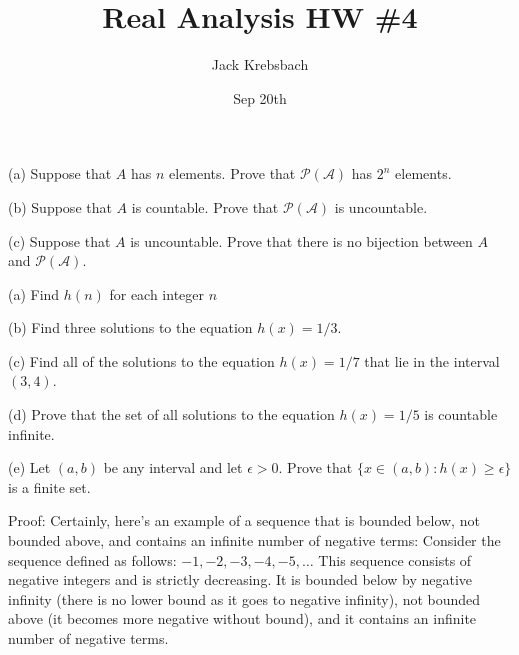 \documentclass{report}
\title{Real Analysis HW \#4}
\author{Jack Krebsbach }
\date{Sep 20th}
\begin{document}
\maketitle
{}


(a) Suppose that $A$ has $n$ elements. Prove that $\mathcal{P}(\mathcal{A})$ has $2^n$ elements.
\bigskip
\par
(b) Suppose that $A$ is countable. Prove that $\mathcal{P}(\mathcal{A})$ is uncountable.
\bigskip
\par
(c) Suppose that $A$ is uncountable. Prove that there is no bijection between $A$ and $\mathcal{P}(\mathcal{A})$.
\bigskip
\par


\sol 
(a) Find $h(n)$ for each integer $n$
\par
\bigskip

(b) Find three solutions to the equation $h(x)=1 / 3$.
\par
\bigskip
(c) Find all of the solutions to the equation $h(x)=1 / 7$ that lie in the interval $(3,4)$.
\par
\bigskip
(d) Prove that the set of all solutions to the equation $h(x)=1 / 5$ is countable infinite.
\par
\bigskip
(e) Let $(a, b)$ be any interval and let $\epsilon>0$. Prove that $\{x \in(a, b): h(x) \geq \epsilon\}$ is a finite set.
\par
\bigskip



Proof: Certainly, here's an example of a sequence that is bounded below, not bounded above, and contains an infinite number of negative terms:
Consider the sequence defined as follows: $-1,-2,-3,-4,-5, \ldots$
This sequence consists of negative integers and is strictly decreasing. It is bounded below by negative infinity (there is no lower bound as it goes to negative infinity), not bounded above (it becomes more negative without bound), and it contains an infinite number of negative terms.
\end{document}
